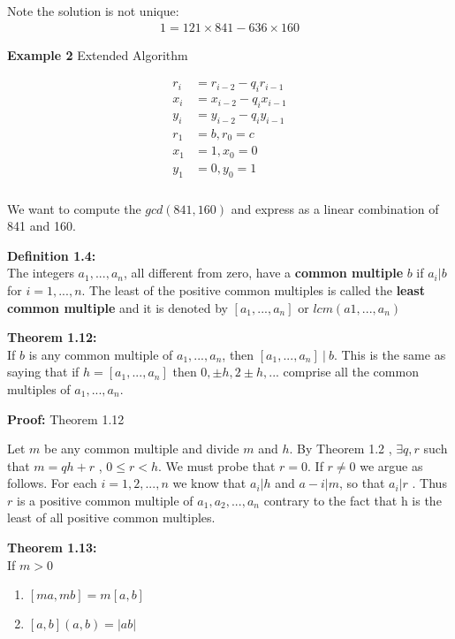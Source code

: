 \documentclass[a4paper]{article}
\begin{document}
Note the solution is not unique:
\begin{align}
1=121\times841 - 636\times 160
\end{align}

\textbf{Example 2} Extended Algorithm


\begin{align}
\begin{split}
r_i&=r_{i-2} - q_ir_{i-1} \\
x_i&=x_{i-2} - q_ix_{i-1} \\
y_i&=y_{i-2} - q_iy_{i-1} \\
r_1&=b , r_0=c \\
x_1&=1 , x_0=0 \\
y_1&=0 , y_0=1 \\
\end{split}
\end{align}



We want to compute the $gcd(841,160)$ and express as a linear combination of 841 and 160.


\textbf{Definition 1.4:}\\
The integers $a_1,...,a_n$, all different from zero, have a \textbf{common multiple} $b$ if $a_i|b$ for $i=1,...,n$. The least of the positive common multiples is called the \textbf{least common multiple} and it is denoted by $[a_1,...,a_n]$ or $lcm(a1,...,a_n)$

\textbf{Theorem 1.12:}\\
If $b$ is any common multiple of $a_1,...,a_n$, then $[a_1,...,a_n]\ |\ b$. This is the same as saying that if $h=[a_1,...,a_n]$ then $0,\pm h,2\pm h,...$ comprise all the common multiples of $a_1,...,a_n$.

\textbf{Proof:} Theorem 1.12

Let $m$ be any common multiple and divide $m$ and $h$. By Theorem 1.2 , $\exists q,r$ such that $m=qh+r$ , $ 0\leq r<h.$ We must probe that $r=0$. If $r\neq0$ we argue as follows. For each $i=1,2,...,n$ we know that $a_i|h$ and $a-i|m$, so that $a_i|r$ . Thus $r$ is a positive common multiple of $a_1,a_2,...,a_n$ contrary to the fact that h is the least of all positive common multiples.


\textbf{Theorem 1.13:}\\
If $m>0$
\begin{enumerate}
    \item $[ma,mb] = m[a,b]$
    \item $[a,b](a,b)=|ab|$
\end{enumerate}
\end{document}
